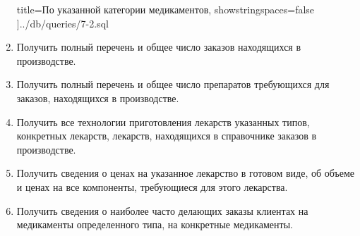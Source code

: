 \documentclass[a4paper]{article}
\begin{document}
\begin{enumerate}
					title={По указанной категории медикаментов},
					showstringspaces=false
				]{../db/queries/7-2.sql}
			\item Получить полный перечень и общее число заказов находящихся в производстве.
				
				
			\item Получить полный перечень и общее число препаратов требующихся для заказов, находящихся в производстве.
				
				
			\item Получить все технологии приготовления лекарств указанных типов, конкретных лекарств, лекарств, находящихся в справочнике заказов в производстве.
				
				
				
			\item Получить сведения о ценах на указанное лекарство в готовом виде, об объеме и ценах на все компоненты, требующиеся для этого лекарства.
				
			\item Получить сведения о наиболее часто делающих заказы клиентах на медикаменты определенного типа, на конкретные медикаменты.

\end{enumerate}
\end{document}

